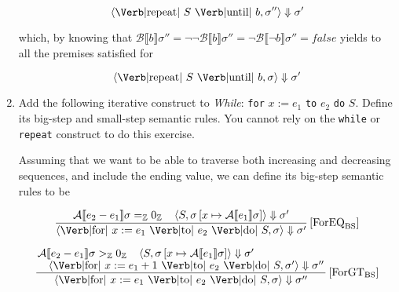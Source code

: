 \documentclass{article}
\begin{document}
\begin{enumerate}[2.]
    $$
      \langle 
        \text{\Verb|repeat| } S \text{ \Verb|until| } b,
        \sigma''
      \rangle \Downarrow \sigma'
    $$

    which, by knowing that
    $
      \mathcal{B}\llbracket b \rrbracket \sigma'' =
      \neg \neg \mathcal{B}\llbracket b \rrbracket \sigma'' =
      \neg \mathcal{B}\llbracket \neg b \rrbracket \sigma'' = false
    $ yields to all the premises satisfied for 

    $$
      \langle 
        \text{\Verb|repeat| } S \text{ \Verb|until| } b,
        \sigma
      \rangle \Downarrow \sigma'
    $$

  \item Add the following iterative construct to \textit{While}:
    \verb|for| $x := e_1$ \verb|to| $e_2$ \verb|do| $S$. Define
    its big-step and small-step semantic rules. You cannot rely 
    on the \verb|while| or \verb|repeat| construct to do this 
    exercise.

    Assuming that we want to be able to traverse both increasing
    and decreasing sequences, and include the ending value, 
    we can define its big-step semantic rules to be 

    $$
    \frac
      {
        \mathcal{A}\llbracket e_2 - e_1 \rrbracket \sigma 
        =_\mathbb{Z} 0_\mathbb{Z} \;\;\;\;
        \langle 
          S, 
          \sigma 
            \left[
              x \mapsto \mathcal{A} 
                \llbracket e_1 \rrbracket \sigma
            \right] 
        \rangle \Downarrow \sigma' 
      }
      {
        \langle 
          \text{\Verb|for| } x:= e_1 \text{ \Verb|to| } e_2
            \text{ \Verb|do| } S,
          \sigma
        \rangle \Downarrow \sigma'
      }
    \left[\text{ForEQ}_\text{BS}\right]
    $$

    $$
    \frac
      {\splitfrac{
        \mathcal{A}\llbracket e_2 - e_1 \rrbracket \sigma 
        >_\mathbb{Z} 0_\mathbb{Z} \;\;\;\;
        \langle 
          S, 
          \sigma 
          \left[
            x \mapsto \mathcal{A} 
              \llbracket e_1 \rrbracket \sigma
          \right] 
        \rangle \Downarrow \sigma'
      }
      {
        \langle
           \text{\Verb|for| } x:= e_1 + 1 \text{ \Verb|to| } e_2
            \text{ \Verb|do| } S,
          \sigma'
        \rangle \Downarrow \sigma''
      }
      }
      {
        \langle 
          \text{\Verb|for| } x:= e_1 \text{ \Verb|to| } e_2
            \text{ \Verb|do| } S,
          \sigma
        \rangle \Downarrow \sigma''
      }
    \left[\text{ForGT}_\text{BS}\right]
    $$


\end{enumerate}
\end{document}
